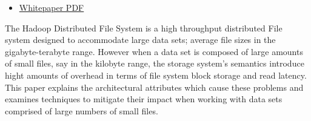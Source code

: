 \documentclass[12pt letterpaper notitlepage]{article}
\begin{document}
\begin{itemize}
\item \href{..//assets/papers/small-file-affects-on-hadoop-distributed-file-sytem.pdf}{Whitepaper PDF}
\end{itemize}

The Hadoop Distributed File System is a high throughput distributed File system designed to accommodate large data sets; average file sizes in the gigabyte-terabyte range. However when a data set is composed of large amounts of small files, say in the kilobyte range, the storage system's semantics introduce hight amounts of overhead in terms of file system block storage and read latency. This paper explains the architectural attributes which cause these problems and examines techniques to mitigate their impact when working with data sets comprised of large numbers of small files.
\end{document}
